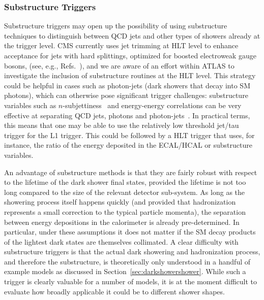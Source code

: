 \subsubsection{Substructure Triggers}
Substructure triggers may open up the possibility of using substructure techniques to distinguish between QCD jets and other types of showers already at the trigger level.
CMS currently uses jet trimming at HLT level to enhance acceptance for jets with hard splittings, optimized for boosted electroweak gauge bosons, (see, e.g., Refs.~\cite{Sirunyan:2017wto,Sirunyan:2017acf}), and we are aware of an effort within ATLAS to investigate the inclusion of substructure routines at the HLT level. This strategy could be helpful in cases such as photon-jets (dark showers that decay into SM photons), which can otherwise pose significant trigger challenges: substructure variables such as $n$-subjettiness~\cite{Thaler:2010tr} and energy-energy correlations can be very effective at separating QCD jets, photons and photon-jets~\cite{Ellis:2012sd,Ellis:2012zp}. In practical terms, this means that one may be able to use the relatively low threshold jet/tau trigger for the L1 trigger. This could be followed by a HLT trigger that uses, for instance, the ratio of the energy deposited in the ECAL/HCAL or substructure variables.

An advantage of substructure methods is that they are fairly robust with respect to the lifetime of the dark shower final states, provided the lifetime is not too long compared to the size of the relevant detector sub-system. As long as the showering process itself happens quickly (and provided that hadronization represents a small correction to the typical particle momenta), the separation between energy depositions in the calorimeter is already pre-determined. In particular, under these assumptions it does not matter if the SM decay products of the lightest dark states are themselves collimated.
A clear difficulty with substructure triggers is that the actual dark showering and hadronization process, and therefore the substructure, is theoretically only understood in a handful of example models as discussed in Section~\ref{sec:darkshowershower}. While such a trigger is clearly valuable for a number of models, it is at the moment difficult to evaluate how broadly applicable it could be to different shower shapes.

